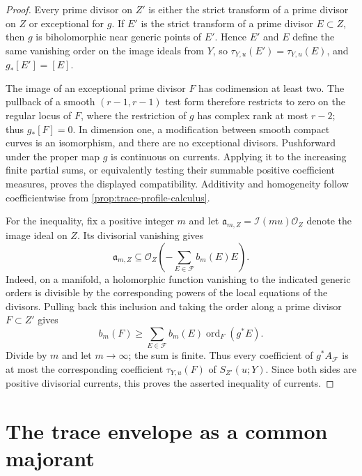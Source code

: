 \begin{proof}
Every prime divisor on $Z'$ is either the strict transform of a prime divisor on $Z$ or exceptional for $g$. If $E'$ is the strict transform of a prime divisor $E\subset Z$, then $g$ is biholomorphic near generic points of $E'$. Hence $E'$ and $E$ define the same vanishing order on the image ideals from $Y$, so $\tau_{Y,u}(E')=\tau_{Y,u}(E)$, and $g_*[E']=[E]$.

The image of an exceptional prime divisor $F$ has codimension at least two. The pullback of a smooth $(r-1,r-1)$ test form therefore restricts to zero on the regular locus of $F$, where the restriction of $g$ has complex rank at most $r-2$; thus $g_*[F]=0$. In dimension one, a modification between smooth compact curves is an isomorphism, and there are no exceptional divisors. Pushforward under the proper map $g$ is continuous on currents. Applying it to the increasing finite partial sums, or equivalently testing their summable positive coefficient measures, proves the displayed compatibility. Additivity and homogeneity follow coefficientwise from \cref{prop:trace-profile-calculus}.

For the inequality, fix a positive integer $m$ and let $\mathfrak a_{m,Z}=\mathcal I(mu)\mathcal O_Z$ denote the image ideal on $Z$. Its divisorial vanishing gives
\[
 \mathfrak a_{m,Z}\subseteq
 \mathcal O_Z\left(-\sum_{E\in\mathcal F}b_m(E)E\right).
\]
Indeed, on a manifold, a holomorphic function vanishing to the indicated generic orders is divisible by the corresponding powers of the local equations of the divisors. Pulling back this inclusion and taking the order along a prime divisor $F\subset Z'$ gives
\begin{equation}\label{eq:trace-ideal-model-inequality}
 b_m(F)\geq\sum_{E\in\mathcal F}
                 b_m(E)\operatorname{ord}_F(g^*E).
\end{equation}
Divide by $m$ and let $m\to\infty$; the sum is finite. Thus every coefficient of $g^*A_{\mathcal F}$ is at most the corresponding coefficient $\tau_{Y,u}(F)$ of $S_{Z'}(u;Y)$. Since both sides are positive divisorial currents, this proves the asserted inequality of currents.
\end{proof}

\section{The trace envelope as a common majorant}

